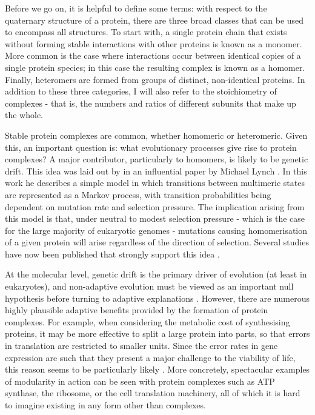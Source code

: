 \documentclass[a4paper,11pt,twoside,openright]{scrbook}
\begin{document}
Before we go on, it is helpful to define some terms: with respect to the quaternary structure of a protein, there are three broad classes that can be used to encompass all structures. To start with, a single protein chain that exists without forming stable interactions with other proteins is known as a monomer. More common is the case where interactions occur between identical copies of a single protein species; in this case the resulting complex is known as a homomer. Finally, heteromers are formed from groups of distinct, non-identical proteins. In addition to these three categories, I will also refer to the stoichiometry of complexes - that is, the numbers and ratios of different subunits that make up the whole.

Stable protein complexes are common, whether homomeric or heteromeric. Given this, an important question is: what evolutionary processes give rise to protein complexes? A major contributor, particularly to homomers, is likely to be genetic drift. This idea was laid out by in an influential paper by Michael Lynch \cite{Lynch2013}. In this work he describes a simple model in which transitions between multimeric states are represented as a Markov process, with transition probabilities being dependent on mutation rate and selection pressure. The implication arising from this model is that, under neutral to modest selection pressure - which is the case for the large majority of eukaryotic genomes - mutations causing homomerisation of a given protein will arise regardless of the direction of selection. Several studies have now been published that strongly support this idea \cite{Dayhoff2010,Alexander2017,Garcia-Seisdedos2017}.

At the molecular level, genetic drift is the primary driver of evolution (at least in eukaryotes), and non-adaptive evolution must be viewed as an important null hypothesis before turning to adaptive explanations \cite{Gould1979,Koonin2016}. However, there are numerous highly plausible adaptive benefits provided by the formation of protein complexes. For example, when considering the metabolic cost of synthesising proteins, it may be more effective to split a large protein into parts, so that errors in translation are restricted to smaller units. Since the error rates in gene expression are such that they present a major challenge to the viability of life, this reason seems to be particularly likely \cite{Gingold2011}. More concretely, spectacular examples of modularity in action can be seen with protein complexes such as ATP synthase, the ribosome, or the cell translation machinery, all of which it is hard to imagine existing in any form other than complexes.
\end{document}
